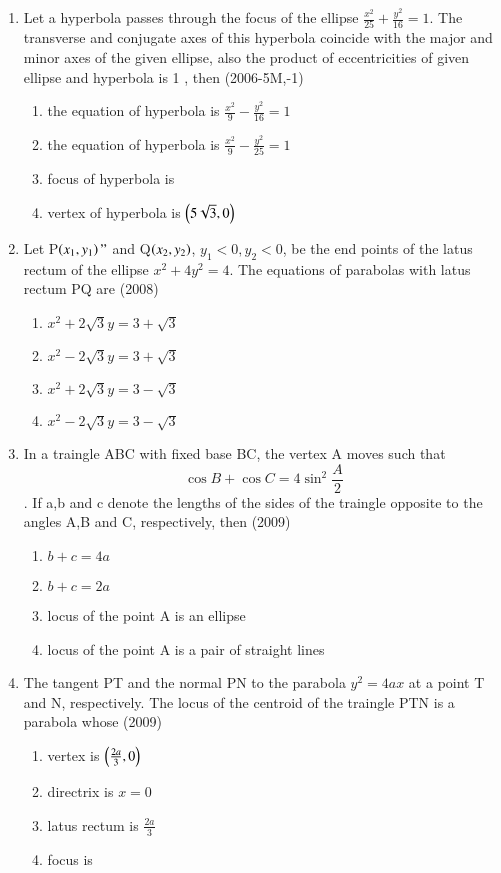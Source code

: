 \documentclass[journal,12pt,onecolumn]{IEEEtran}
\theoremstyle{remark}
\begin{document}
\begin{enumerate}
\item Let a hyperbola passes through the focus of the ellipse \textbf{$\frac{x^2}{25}+\frac{y^2}{16}=1$}. The transverse and conjugate axes of this hyperbola coincide with the major and minor axes of the given ellipse, also the product of eccentricities of given ellipse and hyperbola is 1 , then \hfill (2006-5M,-1)\\
	\begin{enumerate}
		\item the equation of hyperbola is $\frac{x^2}{9}-\frac{y^2}{16}=1$
		\item the equation of hyperbola is $\frac{x^2}{9}-\frac{y^2}{25}=1$
		\item focus of hyperbola is 
		\item vertex of hyperbola is $\left(5\sqrt{3},0\right)$
	\end{enumerate}

\item Let P$\left(x_{1},y_{1}\right)"$ and Q$\left(x_{2},y_{2}\right)$, $y_{1}<0,y_{2}<0$, be the end points of the latus rectum of the ellipse $x^2+4y^2=4$. The equations of parabolas with latus rectum PQ are \hfill(2008)\\
	\begin{enumerate}
		\item $x^2+2\sqrt{3}y=3+\sqrt{3}$
		\item $x^2-2\sqrt{3}y=3+\sqrt{3}$
		\item $x^2+2\sqrt{3}y=3-\sqrt{3}$
		\item $x^2-2\sqrt{3}y=3-\sqrt{3}$
	\end{enumerate}

\item In a traingle ABC with fixed base BC, the vertex A moves such that
	$$\cos{B}+\cos{C}=4\sin^2{\frac{A}{2}}$$.
		If a,b and c denote the lengths of the sides of the traingle opposite to the angles A,B and C, respectively, then \hfill(2009)\\
		\begin{enumerate}
			\item $b+c=4a$
			\item $b+c=2a$
			\item locus of the point A is an ellipse
			\item locus of the point A is a pair of straight lines
		\end{enumerate}

	\item The tangent PT and the normal PN to the parabola $y^2=4ax$ at a point T and N, respectively. The locus of the centroid of the traingle PTN is a parabola whose \hfill(2009)\\
		\begin{enumerate}
			\item vertex is $\left(\frac{2a}{3},0\right)$
			\item directrix is $x=0$
			\item latus rectum is $\frac{2a}{3}$
			\item focus is 
		\end{enumerate}


\end{enumerate}
\end{document}
